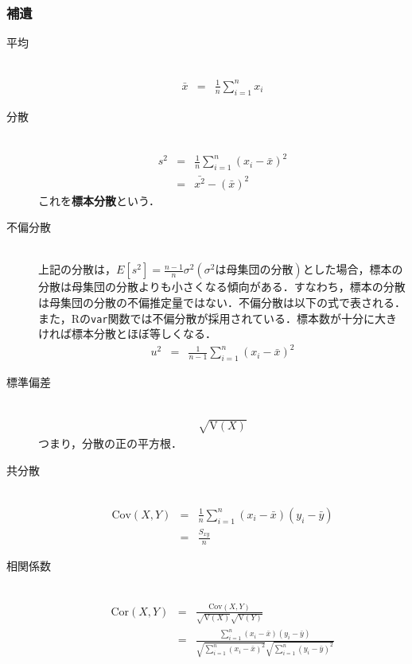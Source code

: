 \documentclass[a4paper,10pt,fleqn]{jarticle}
\begin{document}
\subsubsection{補遺}
\begin{description}
\item[平均]\mbox{}\\
\begin{eqnarray*}
\bar{x}&=&\frac{1}{n}\sum \limits ^n_{i=1}x_i
\end{eqnarray*}
\item[分散]\mbox{}\\
\begin{eqnarray*}
s^2 &=& \frac{1}{n} \sum_{i=1}^{n}(x_i - \bar{x})^2 \\
    &=& \bar{x^2}-\left( \bar{x} \right)^2
\end{eqnarray*}
これを{\bf 標本分散}という．
\item[不偏分散]\mbox{}\\
上記の分散は，$\displaystyle E[s^2] = \frac{n-1}{n} \sigma^2 (\sigma^2\mbox{は母集団の分散})$とした場合，標本の分散は母集団の分散よりも小さくなる傾向がある．すなわち，標本の分散は母集団の分散の不偏推定量ではない．不偏分散は以下の式で表される．また，Rの{\tt var}関数では不偏分散が採用されている．標本数が十分に大きければ標本分散とほぼ等しくなる．
\begin{eqnarray*}
u^2 &=& \frac{1}{n-1} \sum_{i=1}^{n}(x_i - \bar{x})^2 
\end{eqnarray*}
\item[標準偏差]\mbox{}\\
\begin{eqnarray*}
\sqrt{\mathrm{V}(X)}
\end{eqnarray*}
つまり，分散の正の平方根．
\item[共分散]\mbox{}\\
\begin{eqnarray*}
\mathrm{Cov}(X, Y)&=&\frac{1}{n}\sum_{i=1}^{n} (x_{i}-\bar{x})(y_{i}-\bar{y})\\
&=& \frac{S_{xy}}{n}
\end{eqnarray*}
\item[相関係数]\mbox{}\\
\begin{eqnarray*}
\mathrm{Cor}(X,Y)&=&\frac{\mathrm{Cov}(X,Y)}{\sqrt{\mathrm{V}(X)}\sqrt{\mathrm{V}(Y)}}\\
&=&\frac{ \displaystyle \sum_{i=1}^{n} (x_{i}-\bar{x})(y_{i}-\bar{y}) }{ \displaystyle \sqrt{\sum_{i=1}^n(x_{i}-\bar{x})^2} \sqrt{\sum_{i=1}^n(y_{i}-\bar{y})^2}}
\end{eqnarray*}

\end{description}
\end{document}

